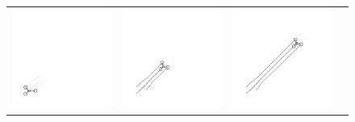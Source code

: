 \documentclass[letterpaper, 10 pt, conference]{ieeeconf}
\begin{document}
\begin{figure}[t]
	\centering
	\setlength{\tabcolsep}{0.1em}
	\begin{tabular}[t]{|c|c|c|c|}
		\hline
			\includegraphics[scale=0.6]{figures/holonomic_0_tikz_gray.pdf} &
			\includegraphics[scale=0.6]{figures/holonomic_1_tikz_gray.pdf} &
			\includegraphics[scale=0.6]{figures/holonomic_2_tikz_gray.pdf} &

\end{tabular}
\end{figure}
\end{document}
